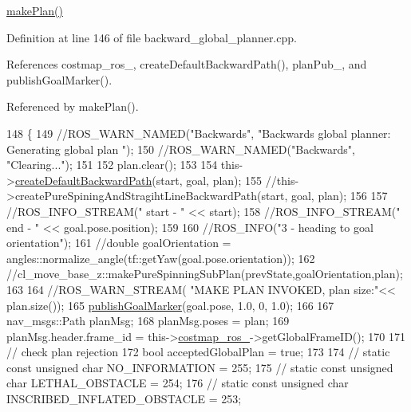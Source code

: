 \hyperlink{classcl__move__base__z_1_1backward__global__planner_1_1BackwardGlobalPlanner_a3f1f3c81e7c52c9305544fd793741a41}{make\+Plan()} 

Definition at line 146 of file backward\+\_\+global\+\_\+planner.\+cpp.



References costmap\+\_\+ros\+\_\+, create\+Default\+Backward\+Path(), plan\+Pub\+\_\+, and publish\+Goal\+Marker().



Referenced by make\+Plan().


\begin{DoxyCode}
148 \{
149     \textcolor{comment}{//ROS\_WARN\_NAMED("Backwards", "Backwards global planner: Generating global plan ");}
150     \textcolor{comment}{//ROS\_WARN\_NAMED("Backwards", "Clearing...");}
151 
152     plan.clear();
153 
154     this->\hyperlink{classcl__move__base__z_1_1backward__global__planner_1_1BackwardGlobalPlanner_a1b4d2eb717f9f63f2309def37c6ce297}{createDefaultBackwardPath}(start, goal, plan);
155     \textcolor{comment}{//this->createPureSpiningAndStragihtLineBackwardPath(start, goal, plan);}
156 
157     \textcolor{comment}{//ROS\_INFO\_STREAM(" start - " << start);}
158     \textcolor{comment}{//ROS\_INFO\_STREAM(" end - " << goal.pose.position);}
159 
160     \textcolor{comment}{//ROS\_INFO("3 - heading to goal orientation");}
161     \textcolor{comment}{//double goalOrientation = angles::normalize\_angle(tf::getYaw(goal.pose.orientation));}
162     \textcolor{comment}{//cl\_move\_base\_z::makePureSpinningSubPlan(prevState,goalOrientation,plan);}
163 
164     \textcolor{comment}{//ROS\_WARN\_STREAM( "MAKE PLAN INVOKED, plan size:"<< plan.size());}
165     \hyperlink{classcl__move__base__z_1_1backward__global__planner_1_1BackwardGlobalPlanner_a3c6784cad10fdadf28323380fe3d6d2b}{publishGoalMarker}(goal.pose, 1.0, 0, 1.0);
166 
167     nav\_msgs::Path planMsg;
168     planMsg.poses = plan;
169     planMsg.header.frame\_id = this->\hyperlink{classcl__move__base__z_1_1backward__global__planner_1_1BackwardGlobalPlanner_a7103c15e6540a514acd421c3c6e194a4}{costmap\_ros\_}->getGlobalFrameID();
170 
171         \textcolor{comment}{// check plan rejection}
172     \textcolor{keywordtype}{bool} acceptedGlobalPlan = \textcolor{keyword}{true};
173 
174     \textcolor{comment}{// static const unsigned char NO\_INFORMATION = 255;}
175     \textcolor{comment}{// static const unsigned char LETHAL\_OBSTACLE = 254;}
176     \textcolor{comment}{// static const unsigned char INSCRIBED\_INFLATED\_OBSTACLE = 253;}

\end{DoxyCode}
